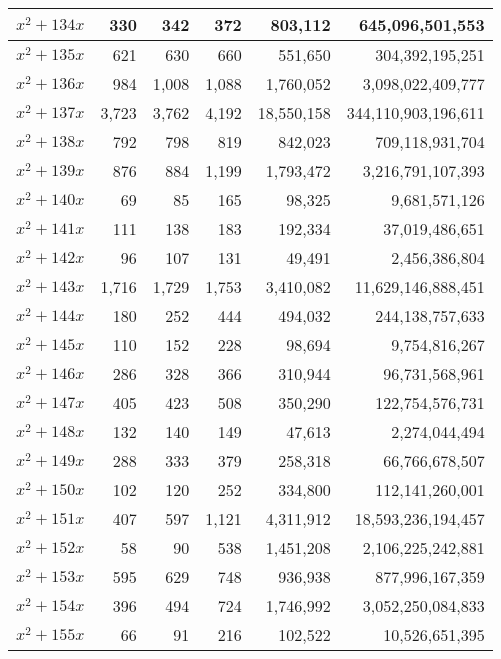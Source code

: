 \documentclass[a4paper]{amsproc}
\theoremstyle{plain}
\begin{document}
\begin{longtable}{ | l | r | r | r | r | r | }
$x^2 + 134x$ & 330 & 342 & 372 & 803{,}112 & 645{,}096{,}501{,}553 \\ \hline
$x^2 + 135x$ & 621 & 630 & 660 & 551{,}650 & 304{,}392{,}195{,}251 \\ \hline
$x^2 + 136x$ & 984 & 1{,}008 & 1{,}088 & 1{,}760{,}052 & 3{,}098{,}022{,}409{,}777 \\ \hline
$x^2 + 137x$ & 3{,}723 & 3{,}762 & 4{,}192 & 18{,}550{,}158 & 344{,}110{,}903{,}196{,}611 \\ \hline
$x^2 + 138x$ & 792 & 798 & 819 & 842{,}023 & 709{,}118{,}931{,}704 \\ \hline
$x^2 + 139x$ & 876 & 884 & 1{,}199 & 1{,}793{,}472 & 3{,}216{,}791{,}107{,}393 \\ \hline
$x^2 + 140x$ & 69 & 85 & 165 & 98{,}325 & 9{,}681{,}571{,}126 \\ \hline
$x^2 + 141x$ & 111 & 138 & 183 & 192{,}334 & 37{,}019{,}486{,}651 \\ \hline
$x^2 + 142x$ & 96 & 107 & 131 & 49{,}491 & 2{,}456{,}386{,}804 \\ \hline
$x^2 + 143x$ & 1{,}716 & 1{,}729 & 1{,}753 & 3{,}410{,}082 & 11{,}629{,}146{,}888{,}451 \\ \hline
$x^2 + 144x$ & 180 & 252 & 444 & 494{,}032 & 244{,}138{,}757{,}633 \\ \hline
$x^2 + 145x$ & 110 & 152 & 228 & 98{,}694 & 9{,}754{,}816{,}267 \\ \hline
$x^2 + 146x$ & 286 & 328 & 366 & 310{,}944 & 96{,}731{,}568{,}961 \\ \hline
$x^2 + 147x$ & 405 & 423 & 508 & 350{,}290 & 122{,}754{,}576{,}731 \\ \hline
$x^2 + 148x$ & 132 & 140 & 149 & 47{,}613 & 2{,}274{,}044{,}494 \\ \hline
$x^2 + 149x$ & 288 & 333 & 379 & 258{,}318 & 66{,}766{,}678{,}507 \\ \hline
$x^2 + 150x$ & 102 & 120 & 252 & 334{,}800 & 112{,}141{,}260{,}001 \\ \hline
$x^2 + 151x$ & 407 & 597 & 1{,}121 & 4{,}311{,}912 & 18{,}593{,}236{,}194{,}457 \\ \hline
$x^2 + 152x$ & 58 & 90 & 538 & 1{,}451{,}208 & 2{,}106{,}225{,}242{,}881 \\ \hline
$x^2 + 153x$ & 595 & 629 & 748 & 936{,}938 & 877{,}996{,}167{,}359 \\ \hline
$x^2 + 154x$ & 396 & 494 & 724 & 1{,}746{,}992 & 3{,}052{,}250{,}084{,}833 \\ \hline
$x^2 + 155x$ & 66 & 91 & 216 & 102{,}522 & 10{,}526{,}651{,}395 \\ \hline

\end{longtable}
\end{document}

